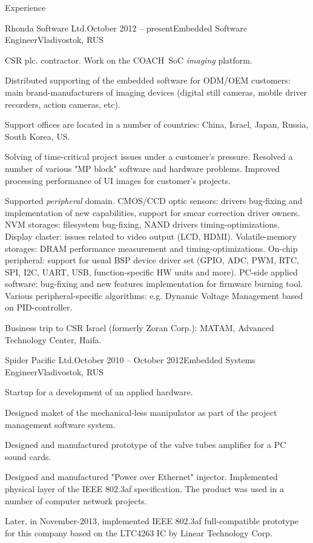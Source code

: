 \documentclass{template}
\begin{document}
\begin{rSection}{Experience}

\begin{rCompany}{Rhonda Software Ltd.}{October 2012 -- present}{Embedded Software Engineer}{Vladivostok, RUS}
\item CSR plc. contractor. Work on the COACH\texttrademark \ SoC \textit{imaging} platform.
\item Distributed supporting of the embedded software for ODM/OEM customers: main brand-manufacturers of imaging devices (digital still cameras, mobile driver recorders, action cameras, etc).
\item Support offices are located in a number of countries: China, Israel, Japan, Russia, South Korea, US.
\item Solving of time-critical project issues under a customer's pressure. Resolved a number of various "MP block" software and hardware problems. Improved processing performance of UI images for customer's projects.
\item Supported \textit{peripheral} domain. CMOS/CCD optic sensors: drivers bug-fixing and implementation of new capabilities, support for smear correction driver owners. NVM storages: filesystem bug-fixing, NAND drivers timing-optimizations. Display claster: issues related to video output (LCD, HDMI). Volatile-memory storages: DRAM performance measurement and timing-optimizations. On-chip peripheral: support for usual BSP device driver set (GPIO, ADC, PWM, RTC, SPI, I2C, UART, USB, function-specific HW units and more). PC-side applied software: bug-fixing and new features implementation for firmware burning tool. Various peripheral-specific algorithms: e.g. Dynamic Voltage Management based on PID-controller.
\item Business trip to CSR Israel (formerly Zoran Corp.): MATAM, Advanced Technology Center, Haifa.
\end{rCompany}

\begin{rCompany}{Spider Pacific Ltd.}{October 2010 -- October 2012}{Embedded Systems Engineer}{Vladivostok, RUS}
\item Startup for a development of an applied hardware.
\item Designed maket of the mechanical-less manipulator as part of the project management software system.
\item Designed and manufactured prototype of the valve tubes amplifier for a PC sound cards.
\item Designed and manufactured "Power over Ethernet" injector. Implemented physical layer of the IEEE 802.3af specification. The product was used in a number of computer network projects.
\item Later, in November-2013, implemented IEEE 802.3af full-compatible prototype for this company based on the LTC4263 IC by Linear Technology Corp.
\end{rCompany}

\end{rSection}
\end{document}
